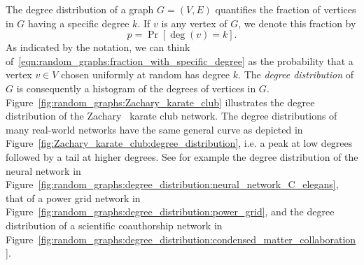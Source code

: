 The degree distribution of a graph $G = (V,E)$ quantifies the fraction
of vertices in $G$ having a specific degree $k$. If $v$ is any vertex
of $G$, we denote this fraction by
\begin{equation}
\label{eqn:random_graphs:fraction_with_specific_degree}
p = \Pr[\deg(v) = k].
\end{equation}
As indicated by the notation, we can think
of~\eqref{eqn:random_graphs:fraction_with_specific_degree} as the
probability that a vertex $v \in V$ chosen uniformly at random has
degree $k$. The \emph{degree distribution}
of $G$ is consequently a histogram of the degrees of vertices in
$G$. Figure~\ref{fig:random_graphs:Zachary_karate_club} illustrates
the degree distribution of the
Zachary~\cite{Zachary1977} karate
club network. The degree distributions of many real-world networks
have the same general curve as depicted in
Figure~\ref{fig:Zachary_karate_club:degree_distribution}, i.e. a peak
at low degrees followed by a tail at higher degrees. See for example
the degree distribution of the neural network in
Figure~\ref{fig:random_graphs:degree_distribution:neural_network_C_elegans},
that of a power grid network in
Figure~\ref{fig:random_graphs:degree_distribution:power_grid}, and the
degree distribution of a scientific coauthorship network in
Figure~\ref{fig:random_graphs:degree_distribution:condensed_matter_collaboration}.

